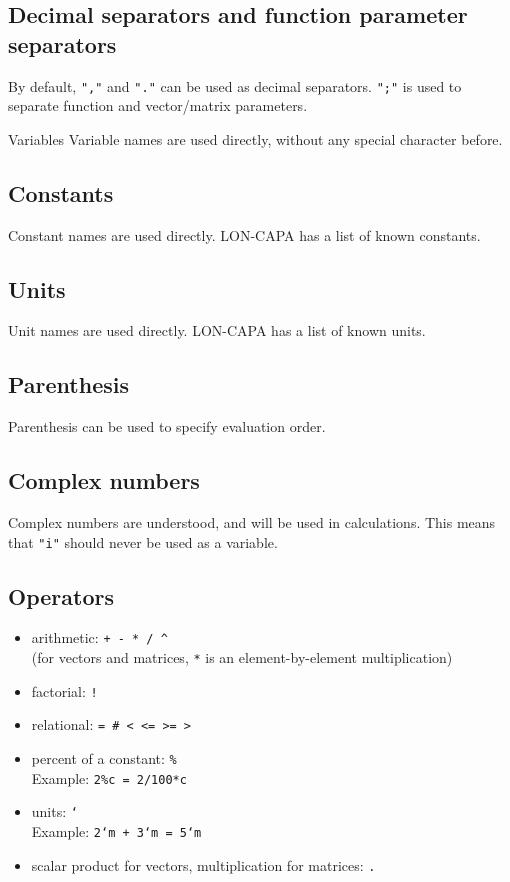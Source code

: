 \subsection{Decimal separators and function parameter separators}
By default, \texttt{","} and \texttt{"."} can be used as decimal separators.
\texttt{";"} is used to separate function and vector/matrix parameters.

Variables
Variable names are used directly, without any special character before.

\subsection{Constants}
Constant names are used directly. LON-CAPA has a list of known constants.

\subsection{Units}
Unit names are used directly. LON-CAPA has a list of known units.

\subsection{Parenthesis}
Parenthesis can be used to specify evaluation order.

\subsection{Complex numbers}
Complex numbers are understood, and will be used in calculations.
This means that \texttt{"i"} should never be used as a variable.

\subsection{Operators}
\begin{itemize}
\item arithmetic: \texttt{+ - * / \^}\\
(for vectors and matrices, \texttt{*} is an element-by-element multiplication)
\item factorial: \texttt{!}
\item relational: \texttt{= \# < <= >= >}
\item percent of a constant: \texttt{\%}\\
Example: \texttt{2\%c = 2/100*c}
\item units: \texttt{`}\\
Example: \texttt{2`m + 3`m = 5`m}
\item scalar product for vectors, multiplication for matrices: \texttt{.}
\end{itemize}

